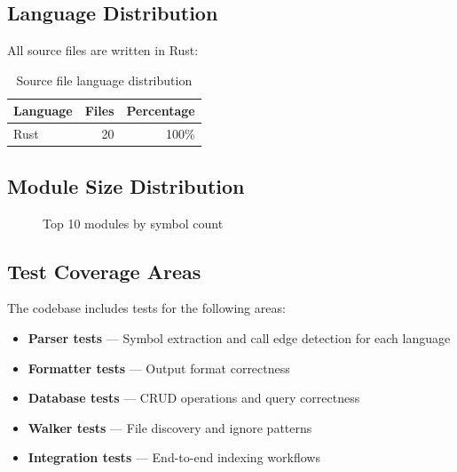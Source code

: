 \subsection{Language Distribution}

All source files are written in Rust:

\begin{table}[h]
\centering
\begin{tabular}{lrr}
\toprule
\textbf{Language} & \textbf{Files} & \textbf{Percentage} \\
\midrule
Rust & 20 & 100\% \\
\bottomrule
\end{tabular}
\caption{Source file language distribution}
\label{tab:language-dist}
\end{table}

\subsection{Module Size Distribution}

\begin{figure}[h]
\centering
{}
\caption{Top 10 modules by symbol count}
\label{fig:module-size}
\end{figure}

\subsection{Test Coverage Areas}

The codebase includes tests for the following areas:

\begin{itemize}
    \item \textbf{Parser tests} --- Symbol extraction and call edge detection for each language
    \item \textbf{Formatter tests} --- Output format correctness
    \item \textbf{Database tests} --- CRUD operations and query correctness
    \item \textbf{Walker tests} --- File discovery and ignore patterns
    \item \textbf{Integration tests} --- End-to-end indexing workflows
\end{itemize}

